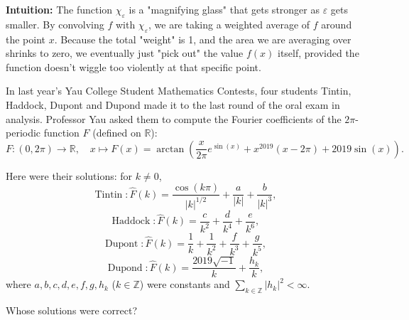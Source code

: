 \begin{solution}
\bigskip

\textbf{Intuition:} 
The function $\chi_\varepsilon$ is a "magnifying glass" that gets stronger as $\varepsilon$ gets smaller. By convolving $f$ with $\chi_\varepsilon$, we are taking a weighted average of $f$ around the point $x$. Because the total "weight" is 1, and the area we are averaging over shrinks to zero, we eventually just "pick out" the value $f(x)$ itself, provided the function doesn't wiggle too violently at that specific point.
\end{solution}

\begin{exercise}
\label{analysis:2020:2}
In last year's Yau College Student Mathematics Contests, four students Tintin, Haddock, Dupont and Dupond made it to the last round of the oral exam in analysis. Professor Yau asked them to compute the Fourier coefficients of the $2\pi$-periodic function $F$ (defined on $\mathbb{R}$):
\[
F:(0,2\pi)\to\mathbb{R},\quad x\mapsto F(x) = \arctan\left(\frac{x}{2\pi}e^{\sin(x)} + x^{2019}(x-2\pi) + 2019\sin(x)\right).
\]

Here were their solutions: for $k\neq 0$,
\[
\operatorname{Tintin}: \widehat{F}(k) = \frac{\cos(k\pi)}{|k|^{1/2}} + \frac{a}{|k|} + \frac{b}{|k|^3},
\]
\[
\operatorname{Haddock}: \widehat{F}(k) = \frac{c}{k^2} + \frac{d}{k^4} + \frac{e}{k^6},
\]
\[
\operatorname{Dupont}: \widehat{F}(k) = \frac{1}{k} + \frac{1}{k^2} + \frac{f}{k^3} + \frac{g}{k^5},
\]
\[
\operatorname{Dupond}: \widehat{F}(k) = \frac{2019\sqrt{-1}}{k} + \frac{h_k}{k},
\]
where $a,b,c,d,e,f,g,h_k$ ($k\in\mathbb{Z}$) were constants and $\sum_{k\in\mathbb{Z}}|h_k|^2<\infty$.

Whose solutions were correct?

\end{exercise}

